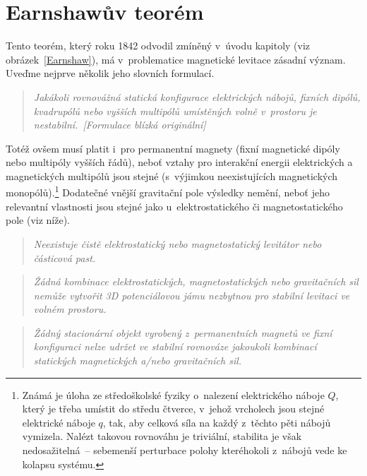 \section{Earnshawův teorém}\label{EarnshawTheorem}%

Tento teorém, který roku 1842 odvodil  zmíněný
v~úvo\-du kapitoly (viz obrázek~\ref{Earnshaw}), má v~problematice magnetické
levitace zásadní význam. Uveďme nejprve několik jeho slovních formulací.

\begin{quote}\itshape \label{ETorig}
  Jakákoli rovnovážná statická konfigurace elektrických nábojů, fixních
  dipólů, kvadrupólů nebo vyšších multipólů umístěných volně v~prostoru je
  nestabilní.~[Formulace blízká originální]
\end{quote}
Totéž ovšem musí platit i~pro permanentní magnety (fixní magnetické dipóly
nebo multipóly vyšších řádů), neboť vztahy pro interakční energii elektrických
a magnetických multipólů jsou stejné (s~výjimkou neexistujících magnetických
monopólů).\footnote{Známá je úloha ze středoškolské fyziky o~nalezení
  elektrického náboje $Q$, který je třeba umístit do středu čtverce, v~jehož
  vrcholech jsou stejné elektrické náboje $q$, tak, aby celková síla na každý
  z~těchto pěti nábojů vymizela. Nalézt takovou rovnováhu je triviální,
  stabilita je však nedosažitelná~-- sebemenší perturbace polohy kteréhokoli
  z~nábojů vede ke kolapsu systému.} Dodatečné vnější gravitační pole výsledky
nemění, neboť jeho relevantní vlastnosti jsou stejné jako
u~elektrostatického či magnetostatického pole (viz níže).

\begin{quote}\itshape \label{ETshg}
  Neexistuje čistě elektrostatický nebo magnetostatický levitátor nebo
  částicová past.~\cite{Sim-Hef-Gei:2001:AMEJP:DiaStMagLev}
\end{quote}

\begin{quote}\itshape \label{ETsgbg}
  Žádná kombinace elektrostatických, magnetostatických nebo gravitačních
  sil nemůže vytvořit 3D potenciálovou jámu nezbytnou pro stabilní levitaci ve
  volném
  prostoru.~\cite{Sim-Gei:2000:JAPPPH:DiaLevFlyFrog,%
    Ber-Gei:1997:EURJP:OfFlyFrogLev}
\end{quote}

\begin{quote}\itshape \label{ETgetal}
  Žádný stacionární objekt vyrobený z~permanentních magnetů ve fixní
  konfiguraci nelze udržet ve stabilní rovnováze jakoukoli kombinací
  statických magnetických a/nebo gravitačních
  sil.~\cite{Gei-etal:1999:NATURE:MagLevFinger}
\end{quote}

